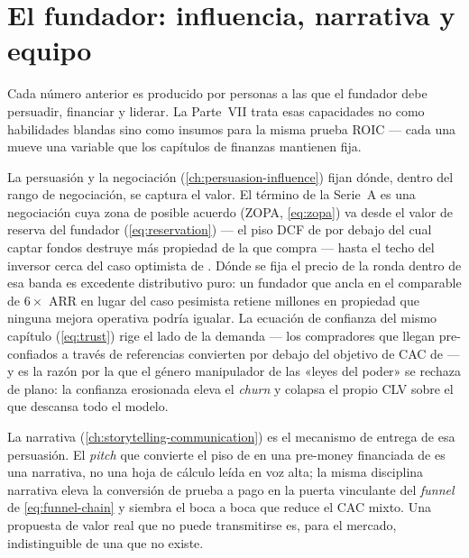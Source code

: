 \section{El fundador: influencia, narrativa y equipo}\label{sec:capstone-founder}

Cada número anterior es producido por personas a las que el fundador debe persuadir, financiar
y liderar. La Parte~VII trata esas capacidades no como habilidades blandas sino como insumos
para la misma prueba ROIC --- cada una mueve una variable que los capítulos de finanzas
mantienen fija.

La persuasión y la negociación (\cref{ch:persuasion-influence}) fijan dónde, dentro del rango
de negociación, se captura el valor. El término de la Serie~A es una negociación cuya zona de
posible acuerdo (ZOPA, \cref{eq:zopa}) va desde el valor de reserva del fundador
(\cref{eq:reservation}) --- el piso DCF de  por debajo del cual captar fondos
destruye más propiedad de la que compra --- hasta el techo del inversor cerca del caso
optimista de . Dónde se fija el precio de la ronda dentro de esa banda es
excedente distributivo puro: un fundador que ancla en el comparable de \(6\times\) ARR en lugar
del caso pesimista retiene millones en propiedad que ninguna mejora operativa podría igualar.
La ecuación de confianza del mismo capítulo (\cref{eq:trust}) rige el lado de la demanda ---
los compradores que llegan pre-confiados a través de referencias convierten por debajo del
objetivo de CAC de  --- y es la razón por la que el género manipulador de las «leyes
del poder» se rechaza de plano: la confianza erosionada eleva el \emph{churn} y colapsa el
propio CLV sobre el que descansa todo el modelo.

La narrativa (\cref{ch:storytelling-communication}) es el mecanismo de entrega de esa persuasión.
El \emph{pitch} que convierte el piso de  en una pre-money financiada de
 es una narrativa, no una hoja de cálculo leída en voz alta; la misma disciplina
narrativa eleva la conversión de prueba a pago en la puerta vinculante del \emph{funnel} de
\cref{eq:funnel-chain} y siembra el boca a boca que reduce el CAC mixto. Una propuesta de valor
real que no puede transmitirse es, para el mercado, indistinguible de una que no existe.

